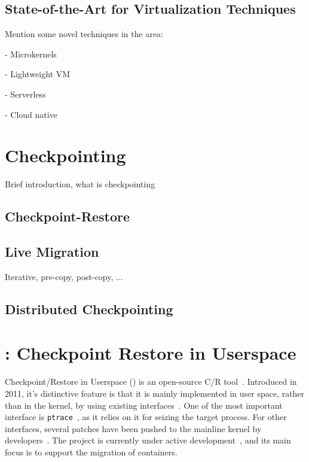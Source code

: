 \subsection{State-of-the-Art for Virtualization Techniques}


Mention some novel techniques in the area:

- Microkernels

- Lightweight VM

- Serverless

- Cloud native

\section{Checkpointing}

Brief introduction, what is checkpointing

\subsection{Checkpoint-Restore}

\subsection{Live Migration}

Iterative, pre-copy, post-copy, ... \cite{Clark2005}

\subsection{Distributed Checkpointing}

\section{\criu: Checkpoint Restore in Userspace}

Checkpoint/Restore in Userspace (\criu) is an open-source C/R tool~\cite{criu-main-page}.
Introduced in 2011, it's distinctive feature is that it is mainly implemented in user space, rather than in the kernel, by using existing interfaces~\cite{Reber2016}.
One of the most important interface is \texttt{ptrace}~\cite{ptrace-manpage}, as it relies on it for seizing the target process.
For other interfaces, several patches have been pushed to the mainline kernel by \criu developers~\cite{criu-kernel-patches}.
The project is currently under active development~\cite{criu-github}, and its main focus is to support the migration of containers.


